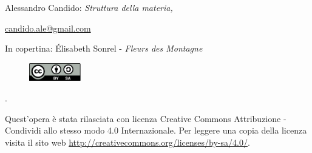 
\cleardoublepage


\begin{titlepage}
	\makeatletter
	\centering
	\vspace*{1.5cm}
	{\huge\bfseries \@title \par}
	\vspace{2cm}
	{\Large\itshape \@author \par}
	\makeatother
	
	\vfill
\end{titlepage}


\thispagestyle{empty}

\hfill

\vfill


\noindent Alessandro Candido: \textit{Struttura della materia,}
\textcopyleft\ \DTMMonthname{\the\month} \the\year

\href{mailto:candido.ale@gmail.com}{candido.ale@gmail.com}
\newline

\noindent In copertina: \'Elisabeth Sonrel - \textit{Fleurs des Montagne}

\begin{figure}
	\centering
	\includegraphics[width=0.2\textwidth]{Licenza/by-sa.pdf}
\end{figure}
.
\newline

Quest'opera è stata rilasciata con licenza Creative Commons Attribuzione - Condividi allo stesso modo 4.0 Internazionale. Per leggere una copia della licenza visita il sito web \href{http://creativecommons.org/licenses/by-sa/4.0/}{http://creativecommons.org/licenses/by-sa/4.0/}.


\clearpage
{}
\thispagestyle{empty}

